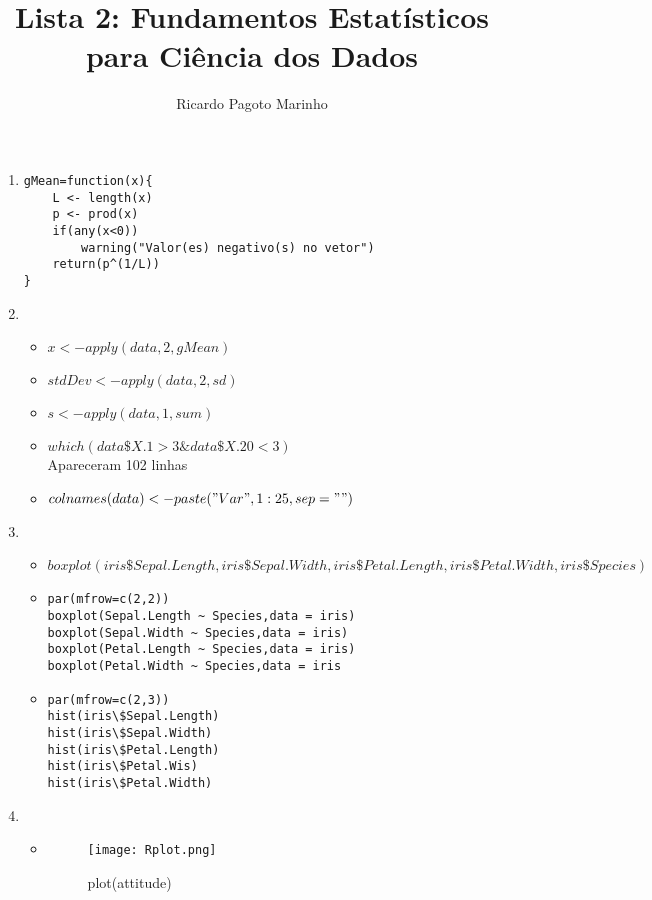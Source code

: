 \documentclass[11pt,a4paper]{book}
\title{Lista 2: Fundamentos Estatísticos para Ciência dos Dados}
\author{Ricardo Pagoto Marinho}
\begin{document}
\maketitle
	\begin{enumerate}
		\item
			\begin{lstlisting}
gMean=function(x){
	L <- length(x)
	p <- prod(x)
	if(any(x<0))
		warning("Valor(es) negativo(s) no vetor")
	return(p^(1/L))
}
			\end{lstlisting}
		\item
			\begin{itemize}
				\item
					$
					x<-apply(data,2,gMean)
					$
				\item
					$
					stdDev<-apply(data,2,sd)					
					$
				\item
					$
					s<-apply(data,1,sum)
					$
				\item
					$
					which(data\$X.1>3 \& data\$X.20<3)
					$\\
					Apareceram 102 linhas
				\item
					$
					colnames(data)<-paste("Var",1:25,sep="")
					$
			\end{itemize}
		\item
			\begin{itemize}
				\item
					$
					boxplot(iris\$Sepal.Length,iris\$Sepal.Width,iris\$Petal.Length,iris\$Petal.Width,iris\$Species)
					$
				\item
					\begin{lstlisting}
par(mfrow=c(2,2))
boxplot(Sepal.Length ~ Species,data = iris)
boxplot(Sepal.Width ~ Species,data = iris)
boxplot(Petal.Length ~ Species,data = iris)
boxplot(Petal.Width ~ Species,data = iris
					\end{lstlisting}
				\item
					\begin{lstlisting}
par(mfrow=c(2,3))
hist(iris\$Sepal.Length)
hist(iris\$Sepal.Width)
hist(iris\$Petal.Length)
hist(iris\$Petal.Wis)
hist(iris\$Petal.Width)
					\end{lstlisting}
			\end{itemize}
		\item
			\begin{itemize}
				\item
					\begin{figure}[b]
					\centering
					\texttt{[image: Rplot.png]}
					\caption{plot(attitude)}
					\end{figure}

\end{itemize}
\end{enumerate}
\end{document}
